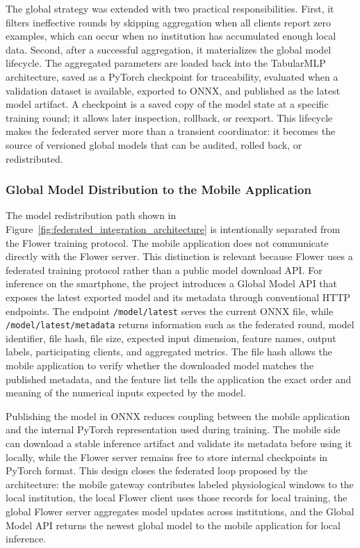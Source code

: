 \documentclass[12pt]{article}
\begin{document}
The global strategy was extended with two practical responsibilities. First, it filters ineffective rounds by skipping aggregation when all clients report zero examples, which can occur when no institution has accumulated enough local data. Second, after a successful aggregation, it materializes the global model lifecycle. The aggregated parameters are loaded back into the TabularMLP architecture, saved as a PyTorch checkpoint for traceability, evaluated when a validation dataset is available, exported to ONNX, and published as the latest model artifact. A checkpoint is a saved copy of the model state at a specific training round; it allows later inspection, rollback, or reexport. This lifecycle makes the federated server more than a transient coordinator: it becomes the source of versioned global models that can be audited, rolled back, or redistributed.

\subsubsection{Global Model Distribution to the Mobile Application}

The model redistribution path shown in Figure~\ref{fig:federated_integration_architecture} is intentionally separated from the Flower training protocol. The mobile application does not communicate directly with the Flower server. This distinction is relevant because Flower uses a federated training protocol rather than a public model download API. For inference on the smartphone, the project introduces a Global Model API that exposes the latest exported model and its metadata through conventional HTTP endpoints. The endpoint \texttt{/model/latest} serves the current ONNX file, while \texttt{/model/latest/metadata} returns information such as the federated round, model identifier, file hash, file size, expected input dimension, feature names, output labels, participating clients, and aggregated metrics. The file hash allows the mobile application to verify whether the downloaded model matches the published metadata, and the feature list tells the application the exact order and meaning of the numerical inputs expected by the model.

Publishing the model in ONNX reduces coupling between the mobile application and the internal PyTorch representation used during training. The mobile side can download a stable inference artifact and validate its metadata before using it locally, while the Flower server remains free to store internal checkpoints in PyTorch format. This design closes the federated loop proposed by the architecture: the mobile gateway contributes labeled physiological windows to the local institution, the local Flower client uses those records for local training, the global Flower server aggregates model updates across institutions, and the Global Model API returns the newest global model to the mobile application for local inference.
\end{document}
